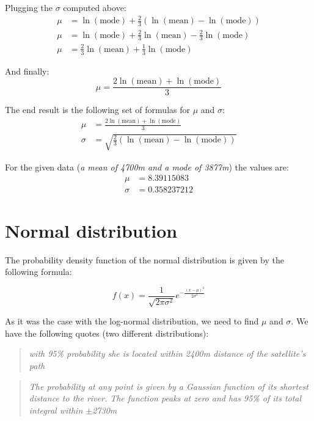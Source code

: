 \documentclass[a4paper,12pt]{article}
\begin{document}
Plugging the \(\sigma\) computed above:
\begin{align*}
  \mu &= \ln(\mbox{mode}) + \frac{2}{3}\left(\ln(\mbox{mean}) - \ln(\mbox{mode})\right)\\
  \mu &= \ln(\mbox{mode}) + \frac{2}{3}\ln(\mbox{mean}) - \frac{2}{3}\ln(\mbox{mode})\\
  \mu &= \frac{2}{3}\ln(\mbox{mean}) + \frac{1}{3}\ln(\mbox{mode})
\end{align*}

And finally:
\[\mu = \frac{2\ln(\mbox{mean}) + \ln(\mbox{mode})}{3}\tag{\(\mu\)}\]

The end result is the following set of formulas for \(\mu\) and \(\sigma\):
\begin{align*}
  \mu &= \frac{2\ln(\mbox{mean}) + \ln(\mbox{mode})}{3}\tag{\(\mu\)}\\
  \sigma &= \sqrt{\frac{2}{3}\left(\ln(\mbox{mean}) - \ln(\mbox{mode})\right)\tag{\(\sigma\)}}
\end{align*}

For the given data (\emph{a mean of 4700m and a mode of 3877m}) the values are:
\begin{align*}
  \mu &= 8.39115083\\
  \sigma &= 0.358237212
\end{align*}

\section{Normal distribution}

The probability density function of the normal distribution is given by the following formula:

\[f(x) = \frac{1}{\sqrt{2\pi\sigma^{2}}}e^{-{\frac {(x-\mu )^{2}}{2\sigma ^{2}}}}\]

As it was the case with the log-normal distribution, we need to find \(\mu\) and \(\sigma\). We have the following
quotes (two different distributions):

\begin{quotation}
\emph{with 95\% probability she is located within 2400m distance of the satellite's path}
\end{quotation}

\begin{quotation}
\emph{The probability at any point is given by a Gaussian function of its shortest distance to the river.
The function peaks at zero and has 95\% of its total integral within $\pm$2730m}
\end{quotation}
\end{document}
